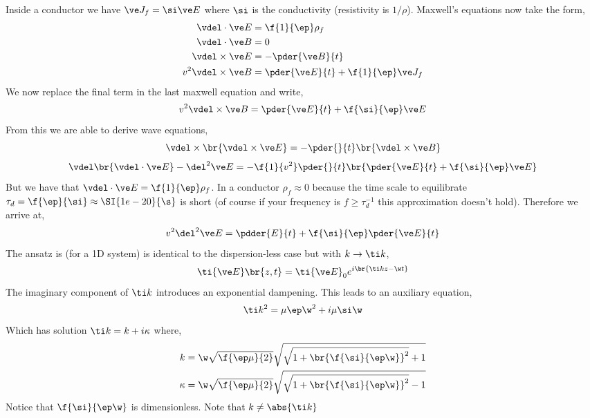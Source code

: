\documentclass{article}
\begin{document}
Inside a conductor we have $\ve J_f = \si \ve E$ where $\si$ is the conductivity (resistivity is $1/\rho$). Maxwell's equations now take the form,
\begin{align*}
    \vdel \cdot \ve E &= \f{1}{\ep} \rho_{f} \\
    \vdel \cdot \ve B &= 0 \\
    \vdel \times \ve E &= -\pder{\ve B}{t} \\
    v^2\vdel \times \ve B &= \pder{\ve E}{t} + \f{1}{\ep} \ve J_f
\end{align*}
We now replace the final term in the last maxwell equation and write,
\[ v^2\vdel \times \ve B = \pder{\ve E}{t} + \f{\si}{\ep} \ve E \]
From this we are able to derive wave equations,
\[ \vdel \times \br{\vdel \times \ve E} = - \pder{}{t}\br{\vdel \times \ve B} \]
\[ \vdel \br{\vdel \cdot \ve E} - \del^2 \ve E = -\f{1}{v^2} \pder{}{t}\br{\pder{\ve E}{t} + \f{\si}{\ep} \ve E} \]
But we have that $\vdel \cdot \ve E = \f{1}{\ep} \rho_{f}$. In a conductor $\rho_{f} \approx 0$ because the time scale to equilibrate $\tau_{d} = \f{\ep}{\si} \approx \SI{1e-20}{\s}$ is short (of course if your frequency is $f \geq \tau_d^{-1}$ this approximation doesn't hold).
Therefore we arrive at,
\[ v^2 \del^2 \ve E = \pdder{E}{t} + \f{\si}{\ep} \pder{\ve E}{t} \]
The ansatz is (for a 1D system) is identical to the dispersion-less case but with $k \to \ti k$,
\[ \ti{\ve E}\br{z,t} = \ti{\ve E}_0 e^{i\br{\ti k z - \w t}} \]
The imaginary component of $\ti k$ introduces an exponential dampening. This leads to an auxiliary equation,
\[ \ti k^2 = \mu \ep \w^2 + i \mu \si \w \]
Which has solution $\ti k = k + i \kappa$ where,
\begin{align*}
    k &= \w \sqrt{\f{\ep \mu}{2}} \sqrt{\sqrt{1 + \br{\f{\si}{\ep \w}}^2}+1} \\
    \kappa &= \w \sqrt{\f{\ep \mu}{2}} \sqrt{\sqrt{1 + \br{\f{\si}{\ep \w}}^2}-1}
\end{align*}
Notice that $\f{\si}{\ep \w}$ is dimensionless. Note that $k \neq \abs{\ti k}$
\end{document}
